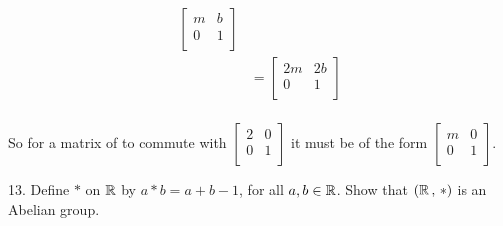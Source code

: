 \begin{mdframed}[style=darkAnswer,frametitle={Joe Starr}]
\begin{multicols}{2}
\begin{align*}
\begin{bmatrix}
m              & b                  \\
0              & 1                  \\
\end{bmatrix} \\
& = \begin{bmatrix}
2m             & 2b                 \\
0              & 1                  \\
\end{bmatrix}                             \\
\end{align*}
\end{multicols}
So for a matrix of to commute with $\begin{bmatrix}
  2 & 0 \\
  0 & 1 \\
  \end{bmatrix}$ it must be of the form $\begin{bmatrix}
  m & 0 \\
  0 & 1 \\
  \end{bmatrix}$.
\end{mdframed}
\newpage
\begin{mdframed}[style=darkQuesion]
13. Define $\ast$ on $\mathbb{R}$ by $a\ast b = a+b-1$, for all $a,b\in \mathbb{R}$. Show that
$\left(\mathbb{R}\,,\,\ast\right)$ is an Abelian group.
\end{mdframed}

